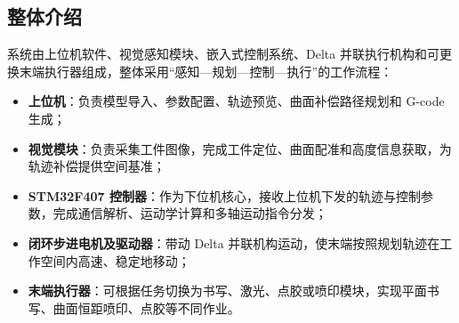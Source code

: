 ﻿\documentclass[UTF8,zihao=-4,fontset=windows]{ctexart}
\begin{document}


\subsection{整体介绍}
系统由上位机软件、视觉感知模块、嵌入式控制系统、Delta 并联执行机构和可更换末端执行器组成，整体采用“感知—规划—控制—执行”的工作流程：
\begin{itemize}
  \item \textbf{上位机}：负责模型导入、参数配置、轨迹预览、曲面补偿路径规划和 G-code 生成；
  \item \textbf{视觉模块}：负责采集工件图像，完成工件定位、曲面配准和高度信息获取，为轨迹补偿提供空间基准；
  \item \textbf{STM32F407 控制器}：作为下位机核心，接收上位机下发的轨迹与控制参数，完成通信解析、运动学计算和多轴运动指令分发；
  \item \textbf{闭环步进电机及驱动器}：带动 Delta 并联机构运动，使末端按照规划轨迹在工作空间内高速、稳定地移动；
  \item \textbf{末端执行器}：可根据任务切换为书写、激光、点胶或喷印模块，实现平面书写、曲面恒距喷印、点胶等不同作业。
\end{itemize}
\end{document}
